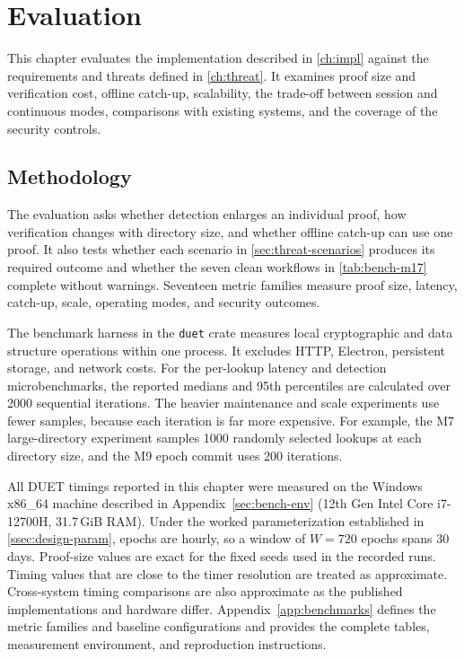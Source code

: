 \chapter{Evaluation}\label{ch:eval}

This chapter evaluates the implementation described in \cref{ch:impl} against the requirements and
threats defined in \cref{ch:threat}. It examines proof size and verification cost, offline catch-up,
scalability, the trade-off between session and continuous modes, comparisons with existing systems, and
the coverage of the security controls.

\section{Methodology}\label{sec:eval-method}

The evaluation asks whether detection enlarges an individual proof, how verification changes with
directory size, and whether offline catch-up can use one proof. It also tests whether each scenario
in \cref{sec:threat-scenarios} produces its required outcome and whether the seven clean workflows
in \cref{tab:bench-m17} complete without warnings. Seventeen metric families measure proof size,
latency, catch-up, scale, operating modes, and security outcomes.

The benchmark harness in the \texttt{duet} crate measures local cryptographic and data structure
operations within one process. It excludes HTTP, Electron, persistent storage, and network costs.
For the per-lookup latency and detection microbenchmarks, the reported medians and 95th percentiles
are calculated over \num{2000} sequential iterations. The heavier maintenance and scale experiments
use fewer samples, because each iteration is far more expensive. For example, the M7 large-directory
experiment samples \num{1000} randomly selected lookups at each directory size, and the M9 epoch
commit uses \num{200} iterations.

All DUET timings reported in this chapter were measured on the Windows x86\_64 machine described in
Appendix~\ref{sec:bench-env} (12th Gen Intel Core i7-12700H, 31.7\,GiB RAM). Under the worked
parameterization established in \cref{ssec:design-param}, epochs are hourly, so a window of $W=720$
epochs spans 30 days. Proof-size values are exact for the fixed seeds used in the recorded runs.
Timing values that are close to the timer resolution are treated as approximate. Cross-system timing
comparisons are also approximate as the published implementations and hardware differ.
Appendix~\ref{app:benchmarks} defines the metric families and baseline configurations and provides
the complete tables, measurement environment, and reproduction instructions.

